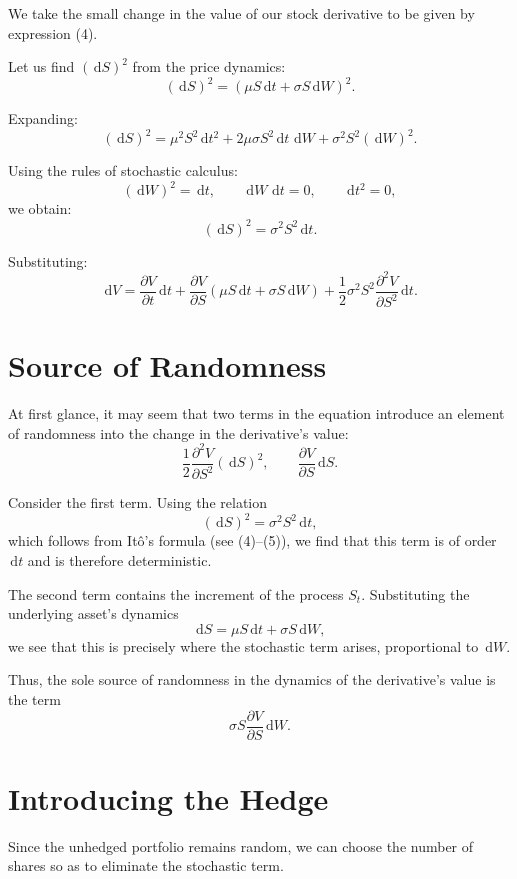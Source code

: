 \documentclass[12pt]{article}
\newcommand{\dd}{\,\mathrm{d}}
\newcommand{\pd}[2]{\frac{\partial #1}{\partial #2}}
\newcommand{\pdd}[2]{\frac{\partial^2 #1}{\partial #2^2}}
\begin{document}
We take the small change in the value of our stock derivative to be given by
expression (4).

Let us find $(\dd S)^2$ from the price dynamics:
\[
(\dd S)^2 = (\mu S \dd t + \sigma S \dd W)^2.
\]

Expanding:
\[
(\dd S)^2 =
\mu^2 S^2 \dd t^2
+ 2\mu\sigma S^2 \dd t\,\dd W
+ \sigma^2 S^2 (\dd W)^2.
\]

Using the rules of stochastic calculus:
\[
(\dd W)^2=\dd t,\qquad
\dd W\,\dd t=0,\qquad
\dd t^2=0,
\]
we obtain:
\begin{equation}
(\dd S)^2=\sigma^2 S^2 \dd t.
\end{equation}

Substituting:
\begin{equation}
\dd V =
\pd{V}{t}\dd t
+ \pd{V}{S}(\mu S \dd t + \sigma S \dd W)
+ \frac{1}{2}\sigma^2 S^2 \pdd{V}{S}\dd t.
\end{equation}

\section{Source of Randomness}

At first glance, it may seem that two terms in the equation introduce an
element of randomness into the change in the derivative's value:
\[
\frac{1}{2}\frac{\partial^2 V}{\partial S^2}(\dd S)^2,
\qquad
\frac{\partial V}{\partial S}\dd S.
\]

Consider the first term. Using the relation
\[
(\dd S)^2=\sigma^2 S^2 \dd t,
\]
which follows from It\^o's formula (see (4)--(5)), we find that this term is
of order $\dd t$ and is therefore deterministic.

The second term contains the increment of the process $S_t$. Substituting
the underlying asset's dynamics
\[
\dd S = \mu S \dd t + \sigma S \dd W,
\]
we see that this is precisely where the stochastic term arises,
proportional to $\dd W$.

Thus, the sole source of randomness in the dynamics of the derivative's
value is the term
\[
\sigma S \frac{\partial V}{\partial S}\dd W.
\]

\section{Introducing the Hedge}

Since the unhedged portfolio remains random, we can choose the number of
shares so as to eliminate the stochastic term.
\end{document}

